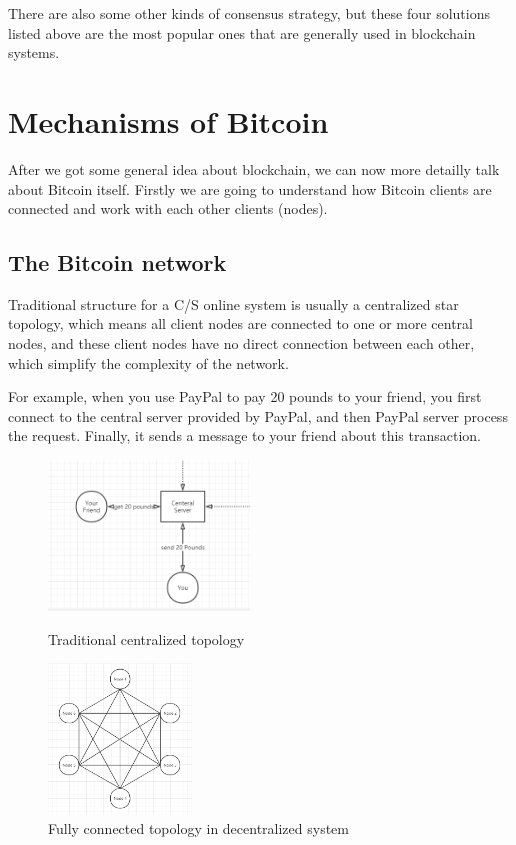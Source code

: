 \documentclass[runningheads]{llncs}
\begin{document}
There are also some other kinds of consensus strategy, but these four solutions listed above are the most popular ones that are generally used in blockchain systems.


\section{Mechanisms of Bitcoin}
After we got some general idea about blockchain, we can now more detailly talk about Bitcoin itself. Firstly we are going to understand how Bitcoin clients are connected and work with each other clients (nodes).

\subsection{The Bitcoin network}
Traditional structure for a C/S online system is usually a centralized star topology, which means all client nodes are connected to one or more central nodes, and these client nodes have no direct connection between each other, which simplify the complexity of the network.


For example, when you use PayPal to pay 20 pounds to your friend, you first connect to the central server provided by PayPal, and then PayPal server process the request. Finally, it sends a message to your friend about this transaction.

\begin{figure}[htbp]
	\centering
	\begin{minipage}[t]{0.53\textwidth}
		\centering
		\includegraphics[height=4cm]{reportpics/4.png}
		\caption{Traditional centralized topology}
	\end{minipage}
	\begin{minipage}[t]{0.42\textwidth}
		\centering
		\includegraphics[height=4cm]{reportpics/5.png}
		\caption{Fully connected topology in decentralized system}
	\end{minipage}
\end{figure}
\end{document}
